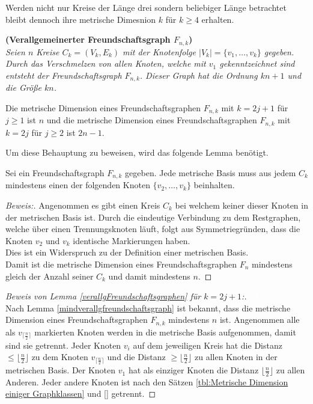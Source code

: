 Werden nicht nur Kreise der Länge drei sondern beliebiger Länge betrachtet bleibt dennoch ihre metrische Dimesnion $k$ für $k\geq 4$ erhalten.
\begin{defi}{\textbf{(Verallgemeinerter Freundschaftsgraph $F_{n,k}$)}}\\
\emph{Seien $n$ Kreise $C_k=(V_k,E_k)$ mit der Knotenfolge $|V_k|=\{v_1,\ldots,v_k\}$ gegeben. Durch das Verschmelzen von allen Knoten, welche mit $v_1$ gekenntzeichnet sind entsteht der Freundschaftsgraph $F_{n,k}$. Dieser Graph hat die Ordnung $kn+1$ und die Größe $kn$.}
\end{defi}

\begin{lem}
\label{verallgFreundschaftsgraphen}
Die metrische Dimension eines Freundschaftsgraphen $F_{n,k}$ mit $k=2j+1$ für $j \geq 1$ ist $n$ und die metrische Dimension eines Freundschaftsgraphen $F_{n,k}$ mit $k=2j$ für $j \geq 2$ ist $2n-1$.
\end{lem}
\vspace{-1mm}
Um diese Behauptung zu beweisen, wird das folgende Lemma benötigt. 
\begin{lem}
\label{mindverallgfreundschaftsgraph}
Sei ein Freundschaftsgraph $F_{n,k}$ gegeben. Jede metrische Basis muss aus jedem $C_k$ mindestens einen der folgenden Knoten $\{v_{2},\ldots,v_k\}$ beinhalten.
\end{lem}
\begin{proof}[Beweis:]
Angenommen es gibt einen Kreis $C_k$ bei welchem keiner dieser Knoten in der metrischen Basis ist. Durch die eindeutige Verbindung zu dem Restgraphen, welche über einen Trennungsknoten läuft, folgt aus Symmetriegründen, dass die Knoten $v_{2}$ und $v_{k}$ identische Markierungen haben.\\Dies ist ein Widerspruch zu der Definition einer metrischen Basis.\\
Damit ist die metrische Dimension eines Freundschaftsgraphen $F_n$ mindestens gleich der Anzahl seiner $C_{k}$ und damit mindestens $n$.
\end{proof}
\vspace{-6mm}
\begin{proof}[Beweis von Lemma \ref{verallgFreundschaftsgraphen} für $k=2j+1$:] \vspace{+1mm}
\textcolor{white}{lala}\\ 
Nach Lemma \ref{mindverallgfreundschaftsgraph} ist bekannt, dass die metrische Dimension eines Freundschaftsgraphen $F_{n,k}$ mindestens $n$ ist. Angenommen alle als $v_{\lceil \frac{n}{2} \rceil}$ markierten Knoten werden in die metrische Basis aufgenommen, damit sind sie getrennt. Jeder Knoten $v_i$ auf dem jeweiligen Kreis hat die Distanz $\leq \lfloor \frac{n}{2} \rfloor$ zu dem Knoten $v_{\lceil \frac{n}{2} \rceil}$ und die Distanz $\geq \lfloor \frac{n}{2} \rfloor$ zu allen Knoten in der metrischen Basis. Der Knoten $v_1$ hat als einziger Knoten die Distanz $\lfloor \frac{n}{2} \rfloor$ zu allen Anderen. Jeder andere Knoten ist nach den Sätzen \ref{tbl:Metrische Dimension einiger Graphklassen} und \ref{} getrennt.
\end{proof}
